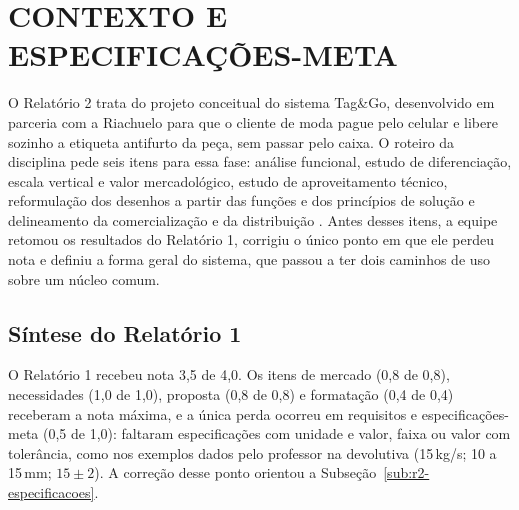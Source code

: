 
\section{CONTEXTO E ESPECIFICAÇÕES-META}
\label{sec:r2-contexto}

O Relatório 2 trata do projeto conceitual do sistema Tag\&Go, desenvolvido em parceria com a Riachuelo para que o cliente de moda pague pelo celular e libere sozinho a etiqueta antifurto da peça, sem passar pelo caixa. O roteiro da disciplina pede seis itens para essa fase: análise funcional, estudo de diferenciação, escala vertical e valor mercadológico, estudo de aproveitamento técnico, reformulação dos desenhos a partir das funções e dos princípios de solução e delineamento da comercialização e da distribuição \cite{zancul2026conceitual}. Antes desses itens, a equipe retomou os resultados do Relatório 1, corrigiu o único ponto em que ele perdeu nota e definiu a forma geral do sistema, que passou a ter dois caminhos de uso sobre um núcleo comum.

\subsection{Síntese do Relatório 1}
\label{sub:r2-sintese}

O Relatório 1 recebeu nota 3,5 de 4,0. Os itens de mercado (0,8 de 0,8), necessidades (1,0 de 1,0), proposta (0,8 de 0,8) e formatação (0,4 de 0,4) receberam a nota máxima, e a única perda ocorreu em requisitos e especificações-meta (0,5 de 1,0): faltaram especificações com unidade e valor, faixa ou valor com tolerância, como nos exemplos dados pelo professor na devolutiva (15\,kg/s; 10 a 15\,mm; $15 \pm 2$). A correção desse ponto orientou a Subseção~\ref{sub:r2-especificacoes}.

